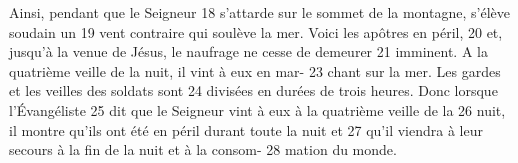 Ainsi, pendant que le Seigneur	 
18	 	s'attarde sur le sommet de la montagne, s'élève soudain un	 
19	 	vent contraire qui soulève la mer. Voici les apôtres en péril,	 
20	 	et, jusqu'à la venue de Jésus, le naufrage ne cesse de demeurer	 
21	 	imminent.
A la quatrième veille de la nuit, il vint à eux en mar-	 
23	 	chant sur la mer. Les gardes et les veilles des soldats sont	 
24	 	divisées en durées de trois heures. Donc lorsque l'Évangéliste	 
25	 	dit que le Seigneur vint à eux à la quatrième veille de la	 
26	 	nuit, il montre qu'ils ont été en péril durant toute la nuit et	 
27	 	qu'il viendra à leur secours à la fin de la nuit et à la consom-	 
28	 	mation du monde.